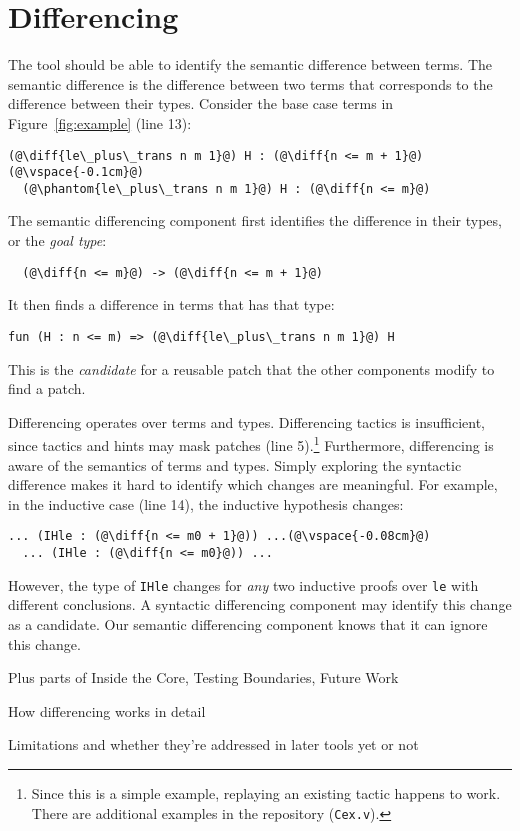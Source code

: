 \section{Differencing}


The tool should be able to identify the semantic difference between terms.
The semantic difference is the difference between two terms that corresponds to
the difference between their types. Consider the base case terms in Figure~\ref{fig:example} (line 13):

\begin{lstlisting}[language=coq]
  (@\diff{le\_plus\_trans n m 1}@) H : (@\diff{n <= m + 1}@)(@\vspace{-0.1cm}@)
  (@\phantom{le\_plus\_trans n m 1}@) H : (@\diff{n <= m}@)
\end{lstlisting}
The semantic differencing component first identifies the difference in their types, or the \textit{goal type}:

\begin{lstlisting}
  (@\diff{n <= m}@) -> (@\diff{n <= m + 1}@)
\end{lstlisting}
It then finds a difference in terms that has that type:

\begin{lstlisting}[language=coq]
  fun (H : n <= m) => (@\diff{le\_plus\_trans n m 1}@) H
\end{lstlisting}
This is the \emph{candidate} for a reusable patch that the other components modify to find a patch.

Differencing operates over terms and types. Differencing tactics
is insufficient, since tactics and hints may mask patches
(line 5).\footnote{Since this is a simple example, replaying an existing tactic happens to work. There
are additional examples in the repository (\lstinline{Cex.v}).}
Furthermore, differencing is aware of the semantics of terms and types.
Simply exploring the syntactic difference %
makes it hard to identify
which changes are meaningful.
For example, in the inductive case (line 14), the inductive hypothesis
changes:

\begin{lstlisting}[language=coq]
  ... (IHle : (@\diff{n <= m0 + 1}@)) ...(@\vspace{-0.08cm}@)
  ... (IHle : (@\diff{n <= m0}@)) ...
\end{lstlisting}

However, the type of \lstinline{IHle} changes for \emph{any} two inductive proofs over \lstinline{le}
with different conclusions. A syntactic differencing component 
may identify this change as a candidate.
Our semantic differencing component knows that it can ignore this change.

Plus parts of Inside the Core, Testing Boundaries, Future Work

How differencing works in detail

Limitations and whether they're addressed in later tools yet or not

